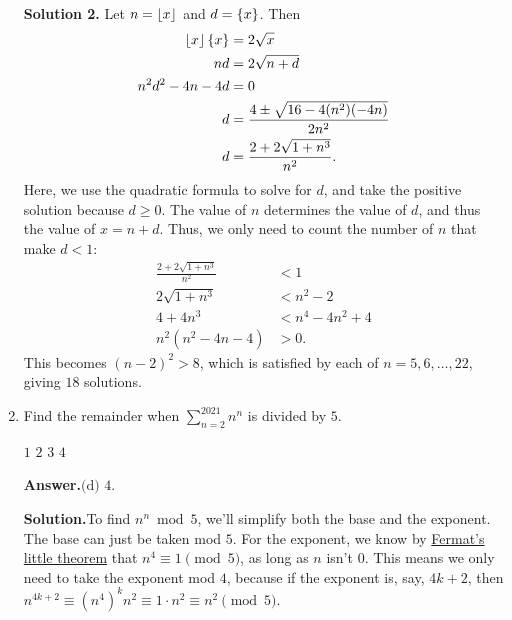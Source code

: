 \documentclass[11pt,paper=letter]{scrartcl}
\newcommand{\ansb}[2]{{\sffamily \bfseries Answer.}\;\(\boxed{\text{(#1) #2}}\).}
\newcommand{\sol}{{\sffamily \bfseries Solution.}\;}
\newcommand{\soln}[1]{{\sffamily \bfseries Solution #1.}\;}
\begin{document}
\begin{enumerate}[align=left,leftmargin=*]
\soln2 Let $n = \left\lfloor x \right\rfloor$ and $d = \left\{ x \right\}$. Then
\begin{align*}
\left\lfloor x \right\rfloor\left\{ x \right\} &= 2\sqrt{x} \\
nd &= 2\sqrt{n + d} \\
n^2d^2 - 4n - 4d &= 0 \\
d &= \frac{4 \pm \sqrt{16 - 4(n^2)(-4n)}}{2n^2} \\
d &= \frac{2 + 2\sqrt{1 + n^3}}{n^2}.
\end{align*}
Here, we use the quadratic formula to solve for $d$, and take the positive solution because $d \ge 0$. The value of $n$ determines the value of $d$, and thus the value of $x = n + d$. Thus, we only need to count the number of $n$ that make $d < 1$:
\begin{align*}
\frac{2 + 2\sqrt{1 + n^3}}{n^2} &< 1 \\
2\sqrt{1 + n^3} &< n^2 - 2 \\
4 + 4n^3 &< n^4 - 4n^2 + 4 \\
n^2\left(n^2 - 4n - 4\right) &> 0.
\end{align*}
This becomes $(n - 2)^2 > 8$, which is satisfied by each of $n = 5, 6, \ldots, 22$, giving $18$ solutions.

\item Find the remainder when $\displaystyle \sum_{n=2}^{2021} n^n$ is divided by $5$.

\fourch
{$1$}
{$2$}
{$3$}
{$4$}

\ansb{d}{$4$}

\sol To find $n^n \bmod 5$, we'll simplify both the base and the exponent. The base can just be taken mod $5$. For the exponent, we know by \href{https://en.wikipedia.org/wiki/Fermat%27s_little_theorem}{Fermat's little theorem} that $n^4 \equiv 1 \pmod 5$, as long as $n$ isn't $0$. This means we only need to take the exponent mod $4$, because if the exponent is, say, $4k + 2$, then $n^{4k + 2} \equiv \left(n^4\right)^kn^2 \equiv 1 \cdot n^2 \equiv n^2 \pmod 5$.


\end{enumerate}
\end{document}
